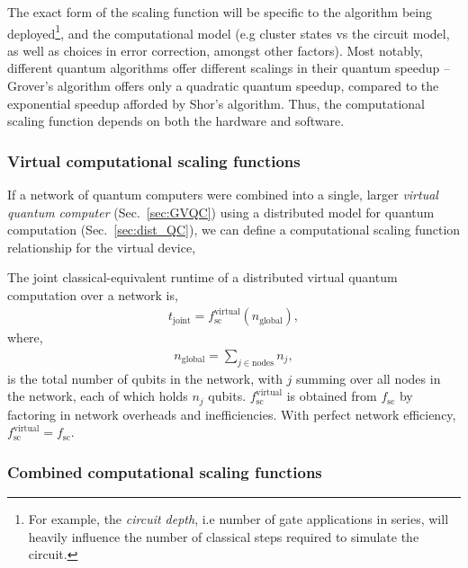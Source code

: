 The exact form of the scaling function will be specific to the algorithm being deployed\footnote{For example, the \textit{circuit depth}, i.e number of gate applications in series, will heavily influence the number of classical steps required to simulate the circuit.}, and the computational model (e.g cluster states vs the circuit model, as well as choices in error correction, amongst other factors). Most notably, different quantum algorithms offer different scalings in their quantum speedup -- Grover's algorithm offers only a quadratic quantum speedup, compared to the exponential speedup afforded by Shor's algorithm. Thus, the computational scaling function depends on both the hardware and software.

%
%

\subsubsection{Virtual computational scaling functions}

If a network of quantum computers were combined into a single, larger \textit{virtual quantum computer} (Sec.~\ref{sec:GVQC}) using a distributed model for quantum computation (Sec.~\ref{sec:dist_QC}), we can define a computational scaling function relationship for the virtual device,

\begin{definition}
The joint classical-equivalent runtime of a distributed virtual quantum computation over a network is,
\begin{align}
t_\text{joint} = f_\text{sc}^\text{virtual}(n_\text{global}),
\end{align}
where,
\begin{align}
n_\text{global} = \sum_{j\in\text{nodes}} n_j,
\end{align}
is the total number of qubits in the network, with $j$ summing over all nodes in the network, each of which holds $n_j$ qubits. $f_\text{sc}^\text{virtual}$ is obtained from $f_\text{sc}$ by factoring in network overheads and inefficiencies. With perfect network efficiency, \mbox{$f_\text{sc}^\text{virtual}=f_\text{sc}$}.
\end{definition}

%
%

\subsubsection{Combined computational scaling functions}\label{sec:comb_comp_sc_func}

